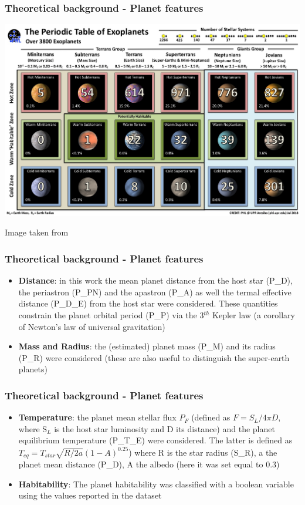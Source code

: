 \documentclass[compress]{beamer}
\begin{document}
\begin{frame}
\frametitle{Theoretical background - Planet features }
\begin{center}
\includegraphics[width=.9\linewidth,]{Pic/PT_Confirmed.jpg}
\end{center}
\begin{center}
Image taken from \cite{exoplanets-catalog}
\end{center}
\end{frame}


\begin{frame}
\frametitle{Theoretical background - Planet features }
\begin{itemize}
\item\textbf{Distance}: in this work the mean planet distance from the host star (P\_D), the periastron (P\_PN) and the apastron (P\_A) as well the termal effective distance (P\_D\_E) from the host star  were considered. These quantities constrain the planet orbital period (P\_P) via the 3$^{th}$ Kepler law (a corollary of Newton's law of universal gravitation)
\item\textbf{Mass and Radius}: the (estimated) planet mass (P\_M) and its radius (P\_R) were considered (these are also useful to distinguish the super-earth planets)
\end{itemize}
\end{frame}
 
\begin{frame}
\frametitle{Theoretical background - Planet features }
\begin{itemize}
\item\textbf{Temperature}: the planet mean stellar flux $P_F$ (defined as $F=S_{L}/4\pi D$, where S$_{L}$ is the host star luminosity and D its distance) and the planet equilibrium temperature (P\_T\_E) were considered. The latter is defined as $T_{eq}=T_{star}\sqrt{R/2a}\left(1-A\right)^{0.25}$) where R is the star radius (S\_R), a the planet mean distance (P\_D), A the albedo (here it was set equal to 0.3)
\item\textbf{Habitability}: The planet habitability was classified with a boolean variable using the values reported in the dataset \cite{planet_dataset}
\end{itemize}
\end{frame}
\end{document}
